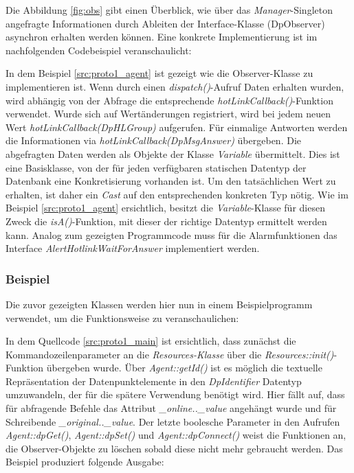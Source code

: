 Die Abbildung \ref{fig:obs} gibt einen Überblick, wie über das \textit{Manager}-Singleton angefragte Informationen durch Ableiten der Interface-Klasse (DpObserver) asynchron erhalten werden können.
Eine konkrete Implementierung ist im nachfolgenden Codebeispiel veranschaulicht:



In dem Beispiel \ref{src:proto1_agent} ist gezeigt wie die Observer-Klasse zu implementieren ist. Wenn durch einen \textit{dispatch()}-Aufruf 
Daten erhalten wurden, wird abhängig von der Abfrage die entsprechende \textit{hotLinkCallback()}-Funktion verwendet. 
Wurde sich auf Wertänderungen registriert, wird bei jedem neuen Wert \textit{hotLinkCallback(DpHLGroup)} aufgerufen. Für
einmalige Antworten werden die Informationen via \textit{hotLinkCallback(DpMsgAnswer)} übergeben.
Die abgefragten Daten werden als Objekte der Klasse \textit{Variable} übermittelt. Dies ist eine Basisklasse, von der für jeden verfügbaren statischen 
Datentyp der Datenbank eine Konkretisierung vorhanden ist. Um den tatsächlichen Wert zu erhalten, ist daher 
ein \textit{Cast} auf den entsprechenden konkreten Typ nötig. Wie im Beispiel \ref{src:proto1_agent} ersichtlich, besitzt die \textit{Variable}-Klasse 
für diesen Zweck die \textit{isA()}-Funktion, mit dieser der richtige Datentyp ermittelt werden kann. Analog zum gezeigten Programmcode
muss für die Alarmfunktionen das Interface \textit{AlertHotlinkWaitForAnswer} implementiert werden.

\subsubsection{Beispiel}
\label{cha:scada_code}

Die zuvor gezeigten Klassen werden hier nun in einem Beispielprogramm verwendet, um die Funktionsweise zu veranschaulichen:



In dem Quellcode \ref{src:proto1_main} ist ersichtlich, dass zunächst die Kommandozeilenparameter an die \textit{Resources-Klasse} über die
\textit{Resources::init()}-Funktion übergeben wurde. Über \textit{Agent::getId()} ist es möglich die textuelle Repräsentation der
Datenpunktelemente in den \textit{DpIdentifier} Datentyp umzuwandeln, der für die spätere Verwendung benötigt wird. Hier fällt auf, dass
für abfragende Befehle das Attribut \textit{\_online..\_value} angehängt wurde und für Schreibende \textit{\_original..\_value}. 
Der letzte boolesche Parameter in den Aufrufen \textit{Agent::dpGet()}, \textit{Agent::dpSet()} und \textit{Agent::dpConnect()} weist
die Funktionen an, die Observer-Objekte zu löschen sobald diese nicht mehr gebraucht werden. Das Beispiel produziert folgende 
Ausgabe:

